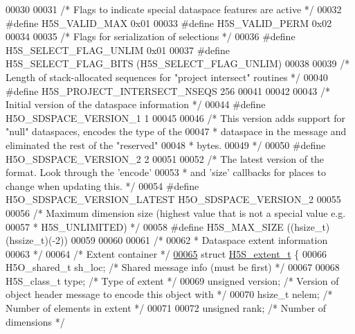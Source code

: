 \begin{DoxyCode}
00030 
00031 \textcolor{comment}{/* Flags to indicate special dataspace features are active */}
00032 \textcolor{preprocessor}{#define H5S\_VALID\_MAX   0x01}
00033 \textcolor{preprocessor}{#define H5S\_VALID\_PERM  0x02}
00034 
00035 \textcolor{comment}{/* Flags for serialization of selections */}
00036 \textcolor{preprocessor}{#define H5S\_SELECT\_FLAG\_UNLIM   0x01}
00037 \textcolor{preprocessor}{#define H5S\_SELECT\_FLAG\_BITS    (H5S\_SELECT\_FLAG\_UNLIM)}
00038 
00039 \textcolor{comment}{/* Length of stack-allocated sequences for "project intersect" routines */}
00040 \textcolor{preprocessor}{#define H5S\_PROJECT\_INTERSECT\_NSEQS 256}
00041 
00042 
00043 \textcolor{comment}{/* Initial version of the dataspace information */}
00044 \textcolor{preprocessor}{#define H5O\_SDSPACE\_VERSION\_1   1}
00045 
00046 \textcolor{comment}{/* This version adds support for "null" dataspaces, encodes the type of the}
00047 \textcolor{comment}{ *      dataspace in the message and eliminated the rest of the "reserved"}
00048 \textcolor{comment}{ *      bytes.}
00049 \textcolor{comment}{ */}
00050 \textcolor{preprocessor}{#define H5O\_SDSPACE\_VERSION\_2   2}
00051 
00052 \textcolor{comment}{/* The latest version of the format.  Look through the 'encode'}
00053 \textcolor{comment}{ *      and 'size' callbacks for places to change when updating this. */}
00054 \textcolor{preprocessor}{#define H5O\_SDSPACE\_VERSION\_LATEST H5O\_SDSPACE\_VERSION\_2}
00055 
00056 \textcolor{comment}{/* Maximum dimension size (highest value that is not a special value e.g.}
00057 \textcolor{comment}{ * H5S\_UNLIMITED) */}
00058 \textcolor{preprocessor}{#define H5S\_MAX\_SIZE            ((hsize\_t)(hssize\_t)(-2))}
00059 
00060 
00061 \textcolor{comment}{/*}
00062 \textcolor{comment}{ * Dataspace extent information}
00063 \textcolor{comment}{ */}
00064 \textcolor{comment}{/* Extent container */}
\hyperlink{struct_h5_s__extent__t}{00065} \textcolor{keyword}{struct }\hyperlink{struct_h5_s__extent__t}{H5S\_extent\_t} \{
00066     H5O\_shared\_t sh\_loc;        \textcolor{comment}{/* Shared message info (must be first) */}
00067 
00068     H5S\_class\_t type;           \textcolor{comment}{/* Type of extent */}
00069     \textcolor{keywordtype}{unsigned} version;           \textcolor{comment}{/* Version of object header message to encode this object with */}
00070     hsize\_t nelem;              \textcolor{comment}{/* Number of elements in extent */}
00071 
00072     \textcolor{keywordtype}{unsigned} rank;              \textcolor{comment}{/* Number of dimensions */}

\end{DoxyCode}
